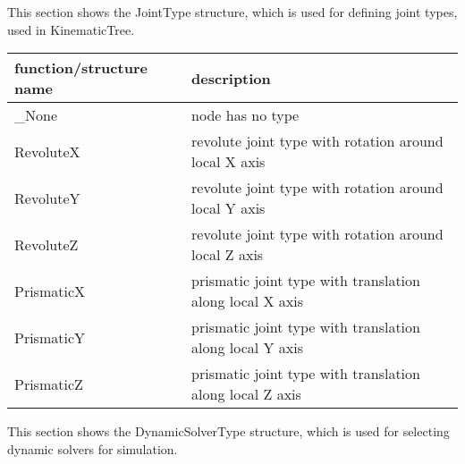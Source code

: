\label{sec:JointType}
This section shows the JointType structure, which is used for defining joint types, used in KinematicTree.



\begin{center}
\footnotesize
\begin{longtable}{| p{8cm} | p{8cm} |} 
\hline
{\bf function/structure name} & {\bf description}\\ \hline
  \_None & node has no type\\ \hline  
  RevoluteX & revolute joint type with rotation around local X axis\\ \hline  
  RevoluteY & revolute joint type with rotation around local Y axis\\ \hline  
  RevoluteZ & revolute joint type with rotation around local Z axis\\ \hline  
  PrismaticX & prismatic joint type with translation along local X axis\\ \hline  
  PrismaticY & prismatic joint type with translation along local Y axis\\ \hline  
  PrismaticZ & prismatic joint type with translation along local Z axis\\ \hline  
\end{longtable}
\end{center}

\label{sec:DynamicSolverType}
This section shows the DynamicSolverType structure, which is used for selecting dynamic solvers for simulation.



